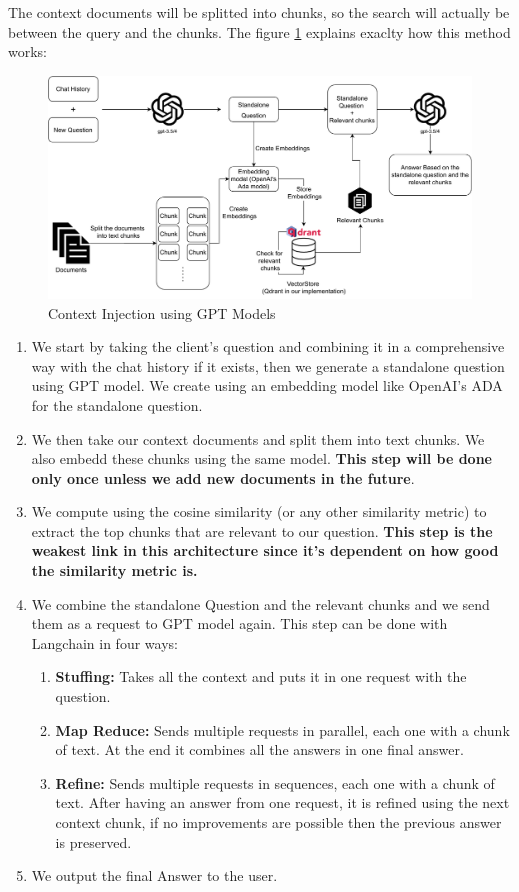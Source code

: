 \documentclass[a4paper,12pt,twoside]{report}
\begin{document}
The context documents will be splitted into chunks, so the search will actually be between the query and the chunks. The figure \ref{chatbotArch} explains exaclty how this method works:
\begin{figure}[H]
		\includegraphics[width=\textwidth, keepaspectratio ]{images/gptLangchain}
	\caption[Context Injection using GPT Models]{Context Injection using GPT Models}
\label{chatbotArch}
\end{figure}	
\begin{enumerate}
\item We start by taking the client's question and combining it in a comprehensive way with the chat history if it exists, then we generate a standalone question using GPT model. We create using an embedding model like OpenAI's ADA for the standalone question.
\item We then take our context documents and split them into text chunks. We also embedd these chunks using the same model. \textbf{This step will be done only once unless we add new documents in the future}.
\item We compute using the cosine similarity (or any other similarity metric) to extract the top chunks that are relevant to our question. \textbf{This step is the weakest link in this architecture since it's dependent on how good the similarity metric is.}
\item We combine the standalone Question and the relevant chunks and we send them as a request to GPT model again. This step can be done with Langchain in four ways:
\begin{enumerate}
\item \textbf{Stuffing:} Takes all the context and puts it in one request with the question.
\item \textbf{Map Reduce:} Sends multiple requests in parallel, each one with a chunk of text. At the end it combines all the answers in one final answer.
\item \textbf{Refine:} Sends multiple requests in sequences, each one with a chunk of text. After having an answer from one request, it is refined using the next context chunk, if no improvements are possible then the previous answer is preserved.
\end{enumerate}
\item We output the final Answer to the user.
\end{enumerate}
\end{document}
